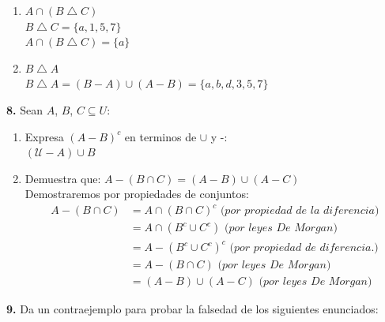 \documentclass[12pt]{article}
\begin{document}
\begin{enumerate}[label=\alph*)]
\begin{enumerate}
        \item $A \cap (B \bigtriangleup C)$\\
        $B \bigtriangleup C = \{a, 1, 5, 7\}$\\
        $A \cap (B \bigtriangleup C) = \{a\}$\\

        \item $ B \bigtriangleup A$\\
        $B \bigtriangleup A = (B - A) \cup (A - B) = \{a, b, d, 3, 5, 7\}$
    \end{enumerate}
\end{enumerate}

%
%
\textbf{8.} Sean $A$, $B$, $C \subseteq U$:
\begin{enumerate}[label=\alph*)]
    \item Expresa $(A - B)^c$ en terminos de $\cup$ y -:\\
    $(\mathcal{U} - A) \cup B$

    \item Demuestra que: $A - (B \cap C) = (A - B) \cup (A - C)$\\
    Demostraremos por propiedades de conjuntos:
    \begin{align*}
        A - (B \cap C) &= A \cap (B \cap C)^c \textit{ (por propiedad de la diferencia)}\\
        &= A \cap (B^c \cup C^c) \textit{ (por leyes De Morgan)}\\
        &= A - (B^c \cup C^c)^c \textit{ (por propiedad de diferencia.)}\\
        &= A - (B \cap C) \textit{ (por leyes De Morgan)}\\
        &= (A - B) \cup (A - C) \textit{ (por leyes De Morgan)}
    \end{align*}
\end{enumerate}

% 
%
\textbf{9.} Da un contraejemplo para probar la falsedad de los siguientes enunciados:
\end{document}
